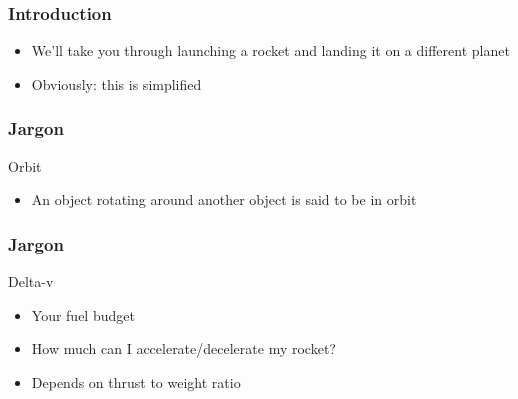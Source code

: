 {
%
\begin{frame}
    \frametitle{Introduction}
    \begin{block}{}
        \begin{itemize}
            \item We'll take you through launching a rocket and landing it on a different planet
            \item Obviously: this is simplified
        \end{itemize}
    \end{block}
\end{frame}
\begin{frame}
    \frametitle{Jargon}
    \begin{block}{Orbit}
        \begin{itemize}
            \item An object rotating around another object is said to be in orbit
        \end{itemize}
    \end{block}
\end{frame}
\begin{frame}
    \frametitle{Jargon}
    \begin{block}{Delta-v}
        \begin{itemize}
            \item Your fuel budget
            \item How much can I accelerate/decelerate my rocket?
            \item Depends on thrust to weight ratio
        \end{itemize}
    \end{block}
\end{frame}
}

